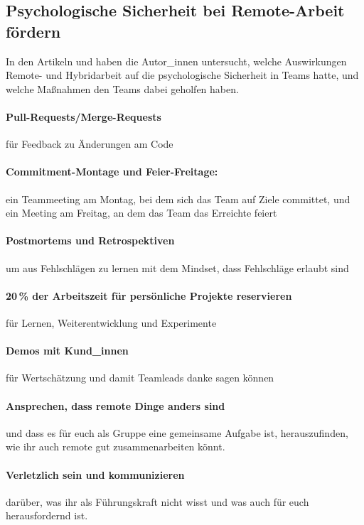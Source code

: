 \subsection{Psychologische Sicherheit bei Remote-Arbeit fördern}
\label{ps-remote}

In den Artikeln \cite{remote-psychological-safety} und \cite{hybrid-psychological-safety} haben die Autor\_innen untersucht, welche Auswirkungen Remote- und Hybridarbeit auf die psychologische Sicherheit in Teams hatte, und welche Maßnahmen den Teams dabei geholfen haben.

\paragraph{Pull-Requests/Merge-Requests} für Feedback zu Änderungen am Code

\paragraph{Commitment-Montage und Feier-Freitage:} ein Teammeeting am Montag, bei dem sich das Team auf Ziele committet, und ein Meeting am Freitag, an dem das Team das Erreichte feiert

\paragraph{Postmortems und Retrospektiven} um aus Fehlschlägen zu lernen mit dem Mindset, dass Fehlschläge erlaubt sind

\paragraph{20\,\% der Arbeitszeit für persönliche Projekte reservieren} für Lernen, Weiterentwicklung und Experimente

\paragraph{Demos mit Kund\_innen} für Wertschätzung und damit Teamleads danke sagen können

\paragraph{Ansprechen, dass remote Dinge anders sind} und dass es für euch als Gruppe eine gemeinsame Aufgabe ist, herauszufinden, wie ihr auch remote gut zusammenarbeiten könnt.

\paragraph{Verletzlich sein und kommunizieren} darüber, was ihr als Führungskraft nicht wisst und was auch für euch herausfordernd ist.

